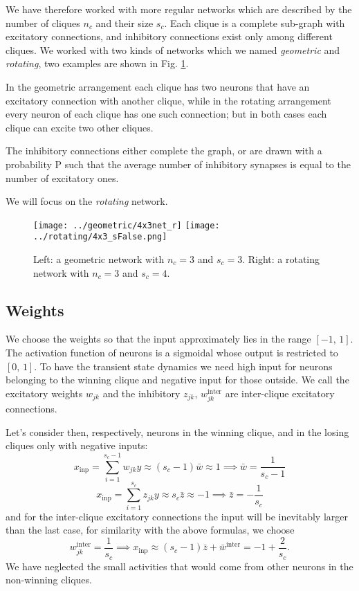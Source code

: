 \documentclass[10pt,a4paper]{article}
\begin{document}
		We have therefore worked with more regular networks which are described by the number of cliques $n_c$ and their size $s_c$. Each clique is a complete sub-graph with excitatory connections, and inhibitory connections exist only among different cliques. We worked with two kinds of networks which we named \emph{geometric} and \emph{rotating}, two examples are shown in Fig. \ref{fig:network}. 
		
		In the geometric arrangement each clique has two neurons that have an excitatory connection with another clique, while in the rotating arrangement every neuron of each clique has one such connection; but in both cases each clique can excite two other cliques. 
		
		The inhibitory connections either complete the graph, or are drawn with a probability P such that the average number of inhibitory synapses is equal to the number of excitatory ones.
		
		We will focus on the \emph{rotating} network.
		\begin{figure}
			\centering
			\texttt{[image: ../geometric/4x3net\_r]}
			\texttt{[image: ../rotating/4x3\_sFalse.png]}
			\caption{Left: a geometric network with $n_c = 3$ and $s_c = 3$. Right: a rotating network with $n_c = 3$ and $s_c = 4$.}
			\label{fig:network}
		\end{figure}
		
	\subsection{Weights}
		We choose the weights so that the input approximately lies in the range $[-1, \, 1]$. The activation function of neurons is a sigmoidal whose output is restricted to $[0, \, 1]$. To have the transient state dynamics we need high input for neurons belonging to the winning clique and negative input for those outside.
		We call the excitatory weights $w_{jk}$ and the inhibitory $z_{jk}$, $w_{jk}^{\text{inter}}$ are inter-clique excitatory connections.
		
		Let's consider then, respectively, neurons in the winning clique, and in the losing cliques only with negative inputs:
		\begin{equation}
			x_{\text{inp}} = \sum_{i=1}^{s_c - 1} w_{jk} y \approx \left(s_c -1 \right) \bar{w} \approx 1 \implies \bar{w} = \frac{1}{s_c - 1 }
		\end{equation}
		\begin{equation}
		x_{\text{inp}} = \sum_{i=1}^{s_c} z_{jk} y \approx s_c \bar{z} \approx -1 \implies \bar{z} = -\frac{1}{s_c}
		\end{equation}
		and for the inter-clique excitatory connections the input will be inevitably larger than the last case, for similarity with the above formulas, we choose 
		\begin{equation}
			w_{jk}^{\text{inter}} = \frac{1}{s_c} \implies x_{\text{inp}} \approx (s_c -1) \bar{z} +  \bar{w}^{\text{inter}} = -1 +\frac{2}{s_c}.
		\end{equation}
		We have neglected the small activities that would come from other neurons in the non-winning cliques.
		
\end{document}
